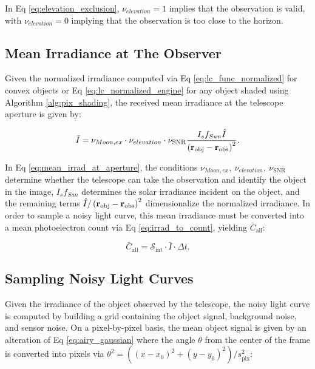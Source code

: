 In Eq \ref{eq:elevation_exclusion}, $\nu_{elevation} = 1$ implies that the observation is valid, with $\nu_{elevation} = 0$ implying that the observation is too close to the horizon.

\subsection{Mean Irradiance at The Observer}

Given the normalized irradiance computed via Eq \ref{eq:lc_func_normalized} for convex objects or Eq \ref{eq:lc_normalized_engine} for any object shaded using Algorithm \ref{alg:pix_shading}, the received mean irradiance at the telescope aperture is given by:

\begin{equation} \label{eq:mean_irrad_at_aperture}
  \bar{I} = \nu_{Moon,ex} \cdot \nu_{elevation} \cdot \nu_{\mathrm{SNR}} \frac{I_s f_{Sun} \hat{I}}{\left( \mathbf{r}_\mathrm{obj} - \mathbf{r}_\mathrm{obs} \right)^2}.
\end{equation}

In Eq \ref{eq:mean_irrad_at_aperture}, the conditions $\nu_{Moon,ex},\: \nu_{elevation},\: \nu_{\mathrm{SNR}}$ determine whether the telescope can take the observation and identify the object in the image, $I_s f_{Sun}$ determines the solar irradiance incident on the object, and the remaining terms $\hat{I} / \left( \mathbf{r}_\mathrm{obj} - \mathbf{r}_\mathrm{obs} \right)^2$ dimensionalize the normalized irradiance. In order to sample a noisy light curve, this mean irradiance must be converted into a mean photoelectron count via Eq \ref{eq:irrad_to_count}, yielding $\bar{C}_\mathrm{all}$:

\begin{equation}
  \bar{C}_\mathrm{all} = \mathcal{S}_\mathrm{int} \cdot \bar{I} \cdot \Delta t.
\end{equation}

\subsection{Sampling Noisy Light Curves} \label{sec:sampling_lcs}

Given the irradiance of the object observed by the telescope, the noisy light curve is computed by building a grid containing the object signal, background noise, and sensor noise. On a pixel-by-pixel basis, the mean object signal is given by an alteration of Eq \ref{eq:airy_gaussian} where the angle $\theta$ from the center of the frame is converted into pixels via $\theta^2 = \left((x - x_0)^2 + (y - y_0)^2 \right) / s_\mathrm{pix}^2$:

